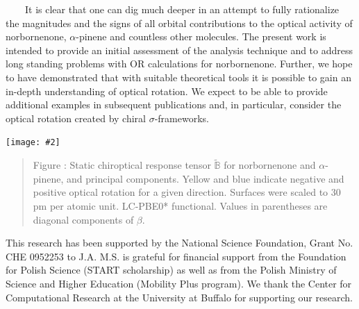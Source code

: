 \documentclass[landscape,a0b,final]{a0poster}
\newcommand{\mat}[1]{\mathbb{#1}} %
\newcommand{\tensortwo}[1]{\mat{#1}}
\newcommand{\bindent}{\ \ \ \ }
\newenvironment{poster}{
  \begin{center}
  \begin{minipage}[c]{0.981\textwidth}
}{
  \end{minipage} 
  \end{center}
}
\newcommand{\pbox}[4]{
\psshadowbox[#3]{
\begin{minipage}[t][#2][t]{#1}
#4
\end{minipage}
}}
\newcommand{\myfig}[3][0]{
\begin{center}
  \vspace{0.25cm}
  \texttt{[image: \#2]}
  \nobreak\medskip
\end{center}}
\newcommand{\mycaption}[1]{
  \vspace{0.25cm}
  \begin{quote}
    {{\sc Figure} \arabic{figure}: #1}
  \end{quote}
  \vspace{0.25cm}
  \stepcounter{figure}
}
\begin{document}
\begin{poster}
\begin{multicols}{3}
    \bindent It is clear that one can dig much deeper in an attempt to fully
    rationalize the magnitudes and the signs of all orbital contributions
    to the optical activity of norbornenone, $\alpha$-pinene and countless
    other molecules. The present work is intended to provide an initial
    assessment of the analysis technique and to address long standing
    problems with OR calculations for norbornenone. Further, we
    hope to have demonstrated that with suitable theoretical tools it is
    possible to gain an in-depth understanding of optical rotation. We
    expect to be able to provide additional examples in subsequent
    publications and, in particular, consider the optical rotation created
    by chiral $\sigma$-frameworks.
    \begin{center}
    \myfig[0]{figures/norbornenone-pinene-comparison}{1.0}
    \mycaption{Static chiroptical response tensor $\tilde{\tensortwo{B}}$
        for norbornenone and $\alpha$-pinene, and principal
        components. Yellow and blue indicate negative and positive optical
        rotation for a given direction.  Surfaces were scaled to 30 pm per
        atomic unit. LC-PBE0* functional. Values in parentheses are
        diagonal components of $\tensortwo{\beta}$.}
    \end{center}

\vspace{0.25cm}
\begin{center}
\pbox{0.8\columnwidth}{}{linewidth=2mm,framearc=0.1,linecolor=ubblue,fillstyle=gradient,gradangle=0,gradbegin=white,gradend=ubgray,gradmidpoint=1.0,framesep=1em}
{\begin{center} \Large \color{ubblue}{\bf{Acknowledgements}}\end{center}}
\end{center}
\vspace{0.25cm}
    
     This research has been supported by the National Science
     Foundation, Grant No. CHE 0952253 to J.A. M.S. is grateful
     for financial support from the Foundation for Polish Science
     (START scholarship) as well as from the Polish Ministry of
     Science and Higher Education (Mobility Plus program). We
     thank the Center for Computational Research at the University
     at Buffalo for supporting our research.
      



\end{multicols}
\end{poster}
\end{document}
